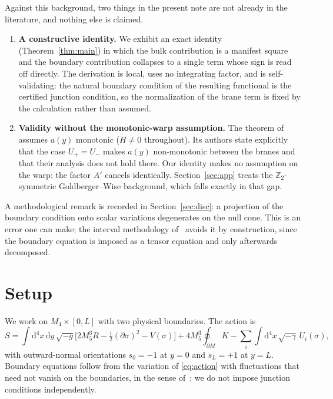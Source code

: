 \documentclass[11pt,a4paper]{article}
\newcommand{\dd}{\mathrm{d}}
\begin{document}
Against this background, two things in the present note are not
already in the literature, and nothing else is claimed.

\begin{enumerate}
\item \textbf{A constructive identity.} We exhibit an exact identity
(Theorem~\ref{thm:main}) in which the bulk contribution is a manifest
square and the boundary contribution collapses to a single term whose
sign is read off directly. The derivation is local, uses no integrating
factor, and is self-validating: the natural boundary condition of the
resulting functional is the certified junction condition, so the
normalization of the brane term is fixed by the calculation rather than
assumed.

\item \textbf{Validity without the monotonic-warp assumption.} The
theorem of~\cite{LS} assumes $a(y)$ monotonic ($H\neq 0$ throughout).
Its authors state explicitly that the case $U_+=U_-$ makes $a(y)$
non-monotonic between the branes and that their analysis does not hold
there. Our identity makes no assumption on the warp: the factor $A'$
cancels identically. Section~\ref{sec:app} treats the
$\mathbb{Z}_2$-symmetric Goldberger--Wise background, which falls
exactly in that gap.
\end{enumerate}

A methodological remark is recorded in Section~\ref{sec:disc}: a
projection of the boundary condition onto scalar variations degenerates
on the null cone. This is an error one can make; the interval
methodology of~\cite{CLP} avoids it by construction, since the boundary
equation is imposed as a tensor equation and only afterwards
decomposed.

\section{Setup}
\label{sec:setup}

We work on $M_4\times[0,L]$ with two physical boundaries. The action is
\begin{equation}
S=\int \dd^4x\,\dd y\,\sqrt{-g}\Big[2M_5^3R-\tfrac12(\partial\sigma)^2
-V(\sigma)\Big]
+4M_5^3\!\oint_{\partial M}\!K
-\sum_i\int \dd^4x\,\sqrt{-\gamma}\,U_i(\sigma),
\label{eq:action}
\end{equation}
with outward-normal orientations $s_0=-1$ at $y=0$ and $s_L=+1$ at
$y=L$. Boundary equations follow from the variation of
\eqref{eq:action} with fluctuations that need not vanish on the
boundaries, in the sense of~\cite{CLP}; we do not impose junction
conditions independently.
\end{document}
